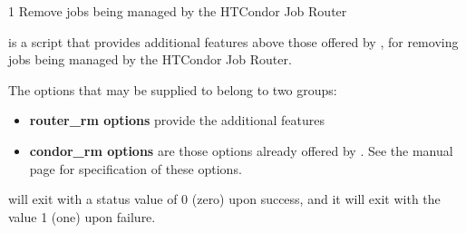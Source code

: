 \begin{ManPage}{\label{man-condor-router-rm}}{1}
{Remove jobs being managed by the HTCondor Job Router}

\Synopsis {}

\Description
{} is a script that provides additional features
above those offered by , 
for removing jobs being managed by the HTCondor Job Router. 

The options that may be supplied to  belong to two groups:
\begin{itemize}
	\item \textbf{router\_rm options} provide the additional features
	\item \textbf{condor\_rm options} are those options already offered
by .  See 
the  manual page for specification of these options. 
\end{itemize}

\begin{Options}
\end{Options}

\ExitStatus

 will exit with a status value of 0 (zero) upon success,
and it will exit with the value 1 (one) upon failure.

\end{ManPage}

